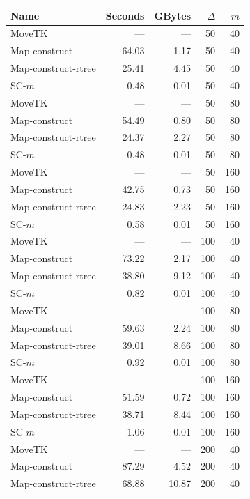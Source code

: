 \documentclass[11pt]{article}
\begin{document}
    \begin{figure} \begin{center}
    \begin{minipage}{0.5\textwidth}
    \begin{tabular}{@{}lrrrr@{}}
        \toprule
        Name & Seconds & GBytes & $\Delta$ & $m$\\
        \midrule
        MoveTK & --- & --- & 50 & 40\\
Map-construct & 64.03 & 1.17 & 50 & 40\\
Map-construct-rtree & 25.41 & 4.45 & 50 & 40\\
        \medskip
SC-$m$ & 0.48 & 0.01 & 50 & 40\\
        MoveTK & --- & --- & 50 & 80\\
Map-construct & 54.49 & 0.80 & 50 & 80\\
Map-construct-rtree & 24.37 & 2.27 & 50 & 80\\
        \medskip
SC-$m$ & 0.48 & 0.01 & 50 & 80\\
        MoveTK & --- & --- & 50 & 160\\
Map-construct & 42.75 & 0.73 & 50 & 160\\
Map-construct-rtree & 24.83 & 2.23 & 50 & 160\\
        \medskip
SC-$m$ & 0.58 & 0.01 & 50 & 160\\
        MoveTK & --- & --- & 100 & 40\\
Map-construct & 73.22 & 2.17 & 100 & 40\\
Map-construct-rtree & 38.80 & 9.12 & 100 & 40\\
        \medskip
SC-$m$ & 0.82 & 0.01 & 100 & 40\\
        MoveTK & --- & --- & 100 & 80\\
Map-construct & 59.63 & 2.24 & 100 & 80\\
Map-construct-rtree & 39.01 & 8.66 & 100 & 80\\
        \medskip
SC-$m$ & 0.92 & 0.01 & 100 & 80\\
        MoveTK & --- & --- & 100 & 160\\
Map-construct & 51.59 & 0.72 & 100 & 160\\
Map-construct-rtree & 38.71 & 8.44 & 100 & 160\\
        \medskip
SC-$m$ & 1.06 & 0.01 & 100 & 160\\
        MoveTK & --- & --- & 200 & 40\\
Map-construct & 87.29 & 4.52 & 200 & 40\\
Map-construct-rtree & 68.88 & 10.87 & 200 & 40\\

\end{tabular}
\end{minipage}
\end{center}
\end{figure}
\end{document}
